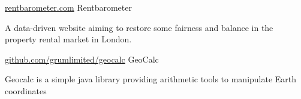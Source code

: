 

\begin{cventries}

  \cventry
    {\href{https://www.rentbarometer.com}{rentbarometer.com}} %
    {\hspace{0.5em}Rentbarometer} %
    {} %
    {} %
    {}
    {
      \begin{cvitems} %
        \item {A data-driven website aiming to restore some fairness and balance in the property rental market in London.}
      \end{cvitems}
    }

  \cventry
    {\href{https://github.com/grumlimited/geocalc}{github.com/grumlimited/geocalc}} %
    {\hspace{0.2em}GeoCalc} %
    {} %
    {} %
    {}
    {
      \begin{cvitems} %
        \item {Geocalc is a simple java library providing arithmetic tools to manipulate Earth coordinates}
      \end{cvitems}
    }
\end{cventries}
